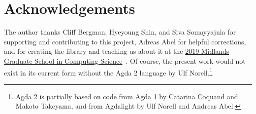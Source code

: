 \section*{Acknowledgements}
The author thanks Cliff Bergman, Hyeyoung Shin, and Siva Somayyajula for supporting and contributing to this project, Adreas Abel for helpful corrections, and \MartinEscardo for creating the \typetopology library and teaching us about it at the \href{http://events.cs.bham.ac.uk/mgs2019/}{2019 Midlands Graduate School in Computing Science}~\cite{MHE}. Of course, the present work would not exist in its current form without the Agda 2 language by Ulf Norell.\footnote{Agda 2 is partially based on code from Agda 1 by Catarina Coquand and Makoto Takeyama, and from Agdalight by Ulf Norell and Andreas Abel.}
